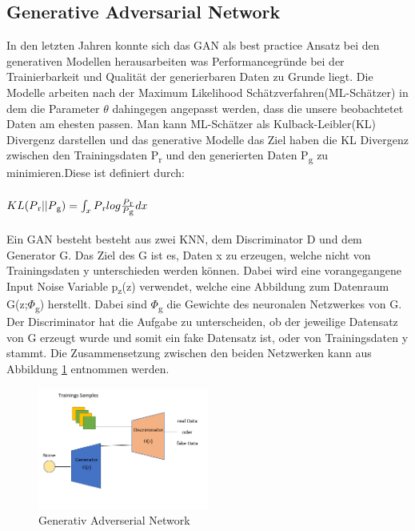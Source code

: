 \documentclass{llncs}
\begin{document}
\subsection{Generative Adversarial Network}
In den letzten Jahren konnte sich das GAN als best practice Ansatz bei den generativen Modellen herausarbeiten was Performancegründe bei der Trainierbarkeit und Qualität der generierbaren Daten zu Grunde liegt\cite{Grundlagen}. Die Modelle arbeiten nach der Maximum Likelihood Schätzverfahren(ML-Schätzer) in dem die Parameter $\theta$ dahingegen angepasst werden, dass die unsere beobachtetet Daten am ehesten passen. Man kann ML-Schätzer als Kulback-Leibler(KL) Divergenz darstellen und das generative Modelle das Ziel haben die KL Divergenz zwischen den Trainingsdaten P\textsubscript{r} und den generierten Daten P\textsubscript{g} zu minimieren.Diese ist definiert durch:
\\\\
\begin{math}
KL(P\textsubscript{r}||P\textsubscript{g})=\int_x P\textsubscript{r}log\frac{P\textsubscript{r}}{P\textsubscript{g}}dx                     
\end{math}
\\\\
Ein GAN besteht besteht aus zwei KNN, dem Discriminator D und dem Generator G. Das Ziel des G ist es, Daten x zu erzeugen, welche nicht von Trainingsdaten y unterschieden werden können. Dabei wird eine vorangegangene Input Noise Variable p\textsubscript{z}(z) verwendet, welche eine Abbildung zum Datenraum G(z;$\Phi$\textsubscript{g}) herstellt. Dabei sind $\Phi$\textsubscript{g} die Gewichte des neuronalen Netzwerkes von G. Der Discriminator hat die Aufgabe zu unterscheiden, ob der jeweilige Datensatz von G erzeugt wurde und somit ein fake Datensatz ist, oder von Trainingsdaten y stammt\cite{goodfellow2014}. Die Zusammensetzung zwischen den beiden Netzwerken kann aus Abbildung \ref{fig:Bild20} entnommen werden.
\\
\begin{figure}[htbp] 
	\centering
	\includegraphics[width=0.5\textwidth]{GAN_GRUNDAUFBAU.png}
	\caption{Generativ Adverserial Network}
	\label{fig:Bild20}
\end{figure}
\end{document}
